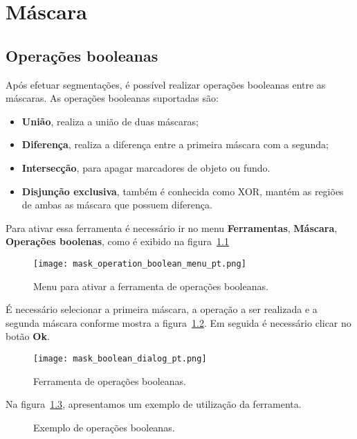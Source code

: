 \chapter{Máscara}


\section{Operações booleanas}

Após efetuar segmentações, é possível realizar operações booleanas entre as máscaras. As operações booleanas suportadas são:

\begin{itemize}
	\item \textbf{União}, realiza a união de duas máscaras;
	\item \textbf{Diferença}, realiza a diferença entre a primeira máscara com a segunda;
	\item \textbf{Intersecção}, para apagar marcadores de objeto ou fundo.
	\item \textbf{Disjunção exclusiva}, também é conhecida como XOR, mantém as regiões de ambas as máscara que possuem diferença.
\end{itemize}

Para ativar essa ferramenta é necessário ir no menu \textbf{Ferramentas}, \textbf{Máscara}, \textbf{Operações boolenas}, como é exibido na figura~\ref{fig:booleano_menu} 

\begin{figure}[!htb]
\centering
\texttt{[image: mask\_operation\_boolean\_menu\_pt.png]}
\caption{Menu para ativar a ferramenta de operações booleanas.}
\label{fig:booleano_menu}
\end{figure}

É necessário selecionar a primeira máscara, a operação a ser realizada e a segunda máscara conforme mostra a figura~\ref{fig:booleano_janela}. Em seguida é necessário clicar no botão \textbf{Ok}.

\begin{figure}[!htb]
\centering
\texttt{[image: mask\_boolean\_dialog\_pt.png]}
\caption{Ferramenta de operações booleanas.}
\label{fig:booleano_janela}
\end{figure}

Na figura~\ref{fig:op_boolana}, apresentamos um exemplo de utilização da ferramenta.

\begin{figure}[!htb]
  \centering
  \hfill
  \hfill  
  \hfill  
  \hfill  
  \hfill  
  \caption{Exemplo de operações booleanas.}
  \label{fig:op_boolana}
\end{figure}

